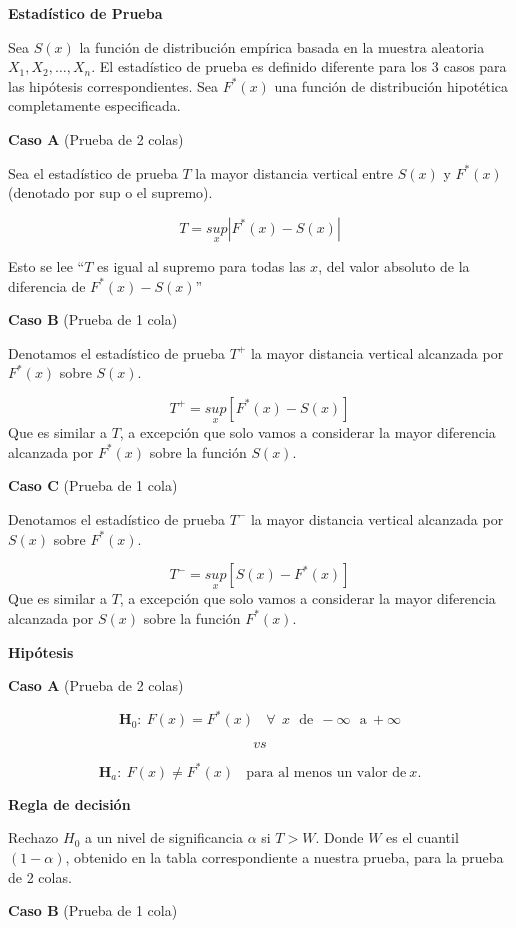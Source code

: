 \documentclass[
  a4paper,
  oneside,
  openany]{book}
\begin{document}
\textbf{Estadístico de Prueba}

Sea \(S(x)\) la función de distribución empírica basada en la muestra aleatoria \(X_{1},X_{2},\ldots,X_{n}\). El estadístico de prueba es definido diferente para los 3 casos para las hipótesis correspondientes. Sea \(F^*(x)\) una función de distribución hipotética completamente especificada.

\textbf{Caso A }(Prueba de 2 colas)

Sea el estadístico de prueba \(T\) la mayor distancia vertical entre \(S(x)\) y \(F^*(x)\)(denotado por sup o el supremo).

\[T=\underset{x}{sup}|F^*(x)-S(x)|\]

Esto se lee ``\(T\) es igual al supremo para todas las \(x\), del valor absoluto de la diferencia de \(F^*(x)-S(x)\)''

\textbf{Caso B }(Prueba de 1 cola)

Denotamos el estadístico de prueba \(T^+\) la mayor distancia vertical alcanzada por \(F^*(x)\) sobre \(S(x)\).

\[T^+=\underset{x}{sup}[F^*(x)-S(x)] \]
Que es similar a \(T\), a excepción que solo vamos a considerar la mayor diferencia alcanzada por \(F^*(x)\) sobre la función \(S(x)\).

\textbf{Caso C }(Prueba de 1 cola)

Denotamos el estadístico de prueba \(T^-\) la mayor distancia vertical alcanzada por \(S(x)\) sobre \(F^*(x)\).

\[T^-=\underset{x}{sup}[S(x)-F^*(x)] \]
Que es similar a \(T\), a excepción que solo vamos a considerar la mayor diferencia alcanzada por \(S(x)\) sobre la función \(F^*(x)\).

\textbf{Hipótesis}

\textbf{Caso A} (Prueba de 2 colas)

\[\textbf{H}_0:\ F(x)=F^*(x) \ \ \ \ \forall \ \ x \ \ \  \mbox{de}\  \ -\infty \ \ \ \mbox{a} \  +\infty \]

\[vs\]

\[\textbf{H}_a: \ F(x) \neq F^*(x) \ \ \ \ \mbox{para al menos un  valor de} \   x.\]

\textbf{Regla de decisión}

Rechazo \(H_0\) a un nivel de significancia \(\alpha\) si \(T>W\). Donde \(W\) es el cuantil \((1-\alpha)\), obtenido en la tabla correspondiente a nuestra prueba, para la prueba de 2 colas.

\textbf{Caso B} (Prueba de 1 cola)
\end{document}
